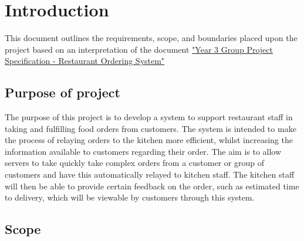 \documentclass[11pt, a4paper]{article}
\begin{document}
\section{Introduction} \label{sec:Intro}

This document outlines the requirements, scope, and boundaries placed upon the project based on an interpretation of the document \href{http://www.macs.hw.ac.uk/~rpp6/teaching/GroupProject/docs/project/GroupProjectSpec2017.pdf}{"Year 3 Group Project Specification - Restaurant Ordering System"}

\subsection{Purpose of project} \label{subec:purpose}

The purpose of this project is to develop a system to support restaurant staff in taking and fulfilling food orders from customers. The system is intended to make the process of relaying orders to the kitchen more efficient, whilst increasing the information available to customers regarding their order. The aim is to allow servers to take quickly take complex orders from a customer or group of customers and have this automatically relayed to kitchen staff. The kitchen staff will then be able to provide certain feedback on the order, such as estimated time to delivery, which will be viewable by customers through this system.

\subsection{Scope} \label{subsec:Scope}
\end{document}
